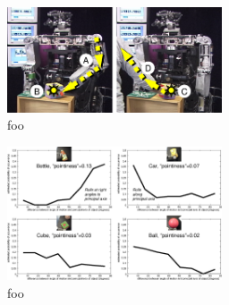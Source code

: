 \begin{figure}[tbh]
  \centerline{\includegraphics[width=2.5in]{tracing_causes}}
  \caption{foo} 
\end{figure}


\begin{figure}[tbh]
  \centerline{\includegraphics[width=2.5in]{rolling-graphs}}
  \caption{foo} 
\end{figure}


